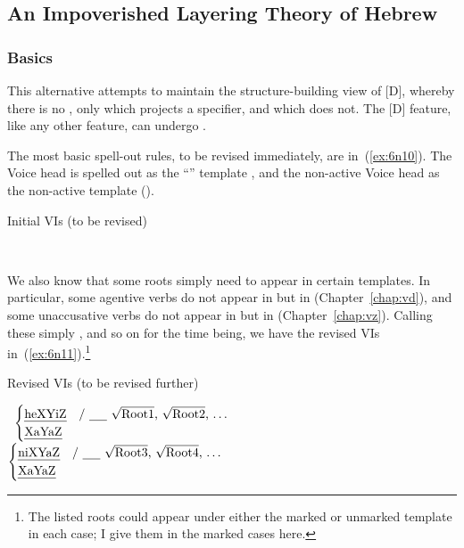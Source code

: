 \begin{exe}
\begin{xlist}
\begin{exe}
\begin{exe}
\begin{xlist}
\begin{exe}
\begin{exe}
\begin{exe}
\begin{exe}
\begin{exe}
\begin{xlist}
\begin{exe}
	\subsection{An Impoverished Layering Theory of Hebrew} \label{aas:jim:pros}
		\subsubsection{Basics}
This alternative attempts to maintain the structure-building view of [D], whereby there is no , only {\vds} which projects a specifier, and {\vzs} which does not. The [D] feature, like any other feature, can undergo .

The most basic spell-out rules, to be revised immediately, are in~(\ref{ex:6n10}). The  Voice head is spelled out as the ``'' template {\thif}, and the non-active Voice head as the non-active template (\tnif).
 \begin{exe}
 \ex  \label{ex:6n10}Initial VIs (to be revised) 
 \begin{xlist} 
 	\ex  {\vds} \lra~{\thif} 
 	\ex  {\vzs} \lra~{\tnif} 
 \z
\z 

We also know that some roots simply need to appear in certain templates. In particular, some agentive verbs do not appear in {\thif} but in {\tkal} (Chapter~\ref{chap:vd}), and some unaccusative verbs do not appear in {\tnif} but in {\tkal} (Chapter~\ref{chap:vz}). Calling these simply ,  and so on for the time being, we have the revised VIs in~(\ref{ex:6n11}).\footnote{The listed roots could appear under either the marked or unmarked template in each case; I give them in the marked cases here.}

 \begin{exe}
 \ex  \label{ex:6n11}Revised VIs (to be revised further) 
 \begin{xlist} 
 	\ex  {\vds} \lra~$\begin{cases} 
		\text{\thif} & \text{/ \trace~\root{Root1}, \root{Root2}, \dots}\\
		\text{\tkal} & \\
		\end{cases}$
 	\ex  {\vzs} \lra~$\begin{cases} 
		\text{\tnif} & \text{/ \trace~\root{Root3}, \root{Root4}, \dots}\\
		\text{\tkal} & \\
		\end{cases}$
 \z
\z 



\end{xlist}
\end{exe}
\end{xlist}
\end{exe}
\end{exe}
\end{xlist}
\end{exe}
\end{exe}
\end{exe}
\end{exe}
\end{exe}
\end{xlist}
\end{exe}
\end{exe}
\end{xlist}
\end{exe}
